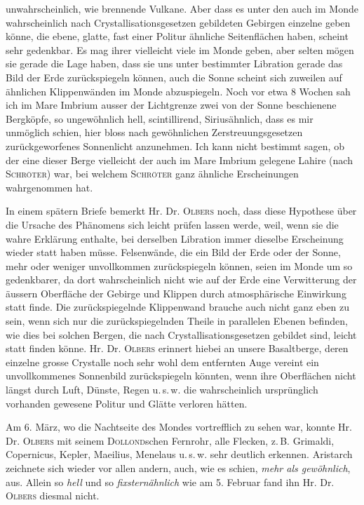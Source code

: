 \par\nobreak\medskip
\noindent unwahrscheinlich, wie brennende Vulkane. Aber dass es unter den auch im Monde wahrscheinlich nach
Crystallisationsgesetzen gebildeten Gebirgen einzelne geben könne, die ebene, glatte, fast einer Politur
ähnliche Seitenflächen haben, scheint sehr gedenkbar. Es mag ihrer vielleicht viele im Monde geben,
aber selten mögen sie gerade die Lage haben, dass sie uns unter bestimmter Libration gerade das Bild
der Erde zurückspiegeln können, auch die Sonne scheint sich zuweilen auf ähnlichen Klippenwänden
im Monde abzuspiegeln. Noch vor etwa 8 Wochen sah ich im Mare Imbrium ausser der Lichtgrenze
zwei von der Sonne beschienene Bergköpfe, so ungewöhnlich hell, scintillirend, Siriusähnlich, dass es
mir unmöglich schien, hier bloss nach gewöhnlichen Zerstreuungsgesetzen zurückgeworfenes Sonnenlicht
anzunehmen. Ich kann nicht bestimmt sagen, ob der eine dieser Berge vielleicht der auch im Mare
Imbrium gelegene Lahire (nach \textsc{Schröter}) war, bei welchem \textsc{Schröter} ganz ähnliche Erscheinungen
wahrgenommen hat.

In einem spätern Briefe bemerkt Hr. Dr. \textsc{Olbers} noch, dass diese Hypothese über die Ursache
des Phänomens sich leicht prüfen lassen werde, weil, wenn sie die wahre Erklärung enthalte, bei derselben Libration immer dieselbe Erscheinung wieder statt haben müsse. Felsenwände, die ein Bild der
Erde oder der Sonne, mehr oder weniger unvollkommen zurückspiegeln können, seien im Monde um
so gedenkbarer, da dort wahrscheinlich nicht wie auf der Erde eine Verwitterung der äussern Oberfläche der Gebirge und Klippen durch atmosphärische Einwirkung statt finde. Die zurückspiegelnde
Klippenwand brauche auch nicht ganz eben zu sein, wenn sich nur die zurückspiegelnden Theile in parallelen Ebenen befinden, wie dies bei solchen Bergen, die nach Crystallisationsgesetzen gebildet sind,
leicht statt finden könne. Hr. Dr. \textsc{Olbers} erinnert hiebei an unsere Basaltberge, deren einzelne grosse
Crystalle noch sehr wohl dem entfernten Auge vereint ein unvollkommenes Sonnenbild zurückspiegeln
könnten, wenn ihre Oberflächen nicht längst durch Luft, Dünste, Regen u.\,s.\,w. die wahrscheinlich ursprünglich vorhanden gewesene Politur und Glätte verloren hätten.

Am 6. März, wo die Nachtseite des Mondes vortrefflich zu sehen war, konnte Hr. Dr. \textsc{Olbers}
mit seinem \textsc{Dollond}schen Fernrohr, alle Flecken, z.\,B. Grimaldi, Copernicus, Kepler, Maeilius, Menelaus u.\,s.\,w. sehr deutlich erkennen. Aristarch zeichnete sich wieder vor allen andern, auch, wie es
schien, \emph{mehr als gewöhnlich}, aus. Allein so \emph{hell} und so \emph{fixsternähnlich} wie am 5. Februar fand ihn Hr.
Dr. \textsc{Olbers} diesmal nicht.

